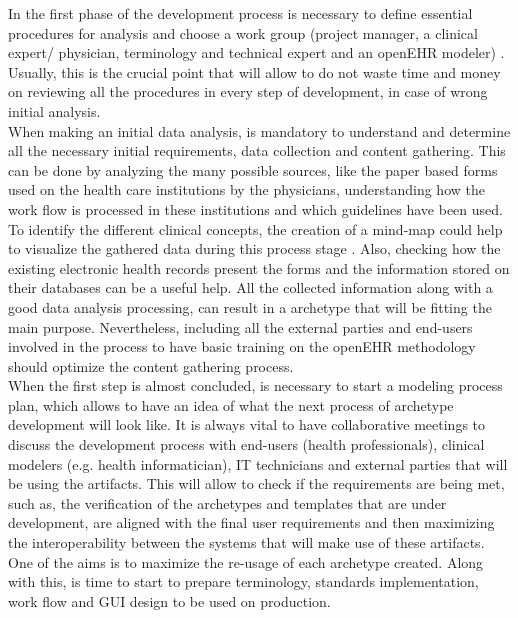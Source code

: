 \documentclass[mim_thesis.tex]{subfiles}
\begin{document}
In the first phase of the development process is necessary to define essential procedures for analysis and choose a work group (project manager, a clinical expert/ physician, terminology and technical expert and an openEHR modeler) \citep{moner2018archetype}. Usually, this is the crucial point that will allow to do not waste time and money on reviewing all the procedures in every step of development, in case of wrong initial analysis. \\

When making an initial data analysis, is mandatory to understand and determine all the necessary initial requirements, data collection and content gathering. This can be done by analyzing the many possible sources, like the paper based forms used on the health care institutions by the physicians, understanding how the work flow is processed in these institutions and which guidelines have been used. To identify the different clinical concepts, the creation of a mind-map could help to visualize the gathered data during this process stage \citep{marcos2010towards}. Also, checking how the existing electronic health records present the forms and the information stored on their databases can be a useful help. All the collected information along with a good data analysis processing, can result in a archetype that will be fitting the main purpose. Nevertheless, including all the external parties and end-users involved in the process to have basic training on the openEHR methodology should optimize the content gathering process. \\

When the first step is almost concluded, is necessary to start a modeling process plan, which allows to have an idea of what the next process of archetype development will look like. It is always vital to have collaborative meetings to discuss the development process with end-users (health professionals), clinical modelers (e.g. health informatician), IT technicians and external parties that will be using the artifacts. This will allow to check if the requirements are being met, such as, the verification of the archetypes and templates that are under development, are aligned with the final user requirements and then maximizing the interoperability between the systems that will make use of these artifacts. One of the aims is to maximize the re-usage of each archetype created. Along with this, is time to start to prepare terminology, standards implementation, work flow and \ac{GUI} design to be used on production. \\
\end{document}
